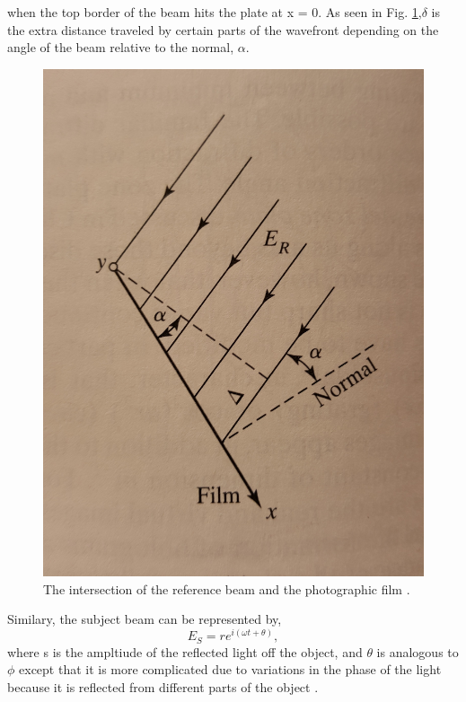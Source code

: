 \documentclass[ notitlepage, numerical, 11pt]{revtex4-1} %
\begin{document}
when the top border of the beam hits the plate at x = 0. As seen in Fig. \ref{eRefMath},$\delta$ is the extra distance traveled by certain parts of the wavefront depending on the angle of the beam relative to the normal, $\alpha$.

\begin{figure}[H]
\centerline{\includegraphics[scale = .12]{eRefMath.jpg}}
\caption{The intersection of the reference beam and the photographic film \cite{optics}.}
\label{eRefMath}
\end{figure} 

 Similary, the subject beam can be represented by,
\begin{equation}
E_{S} = re^{i(\omega t + \theta)},
\label{eSub}
\end{equation}
where s is the ampltiude of the reflected light off the object, and $\theta$ is analogous to $\phi$ except that it is more complicated due to variations in the phase of the light because it is reflected from different parts of the object \cite{optics}. 
\end{document}
